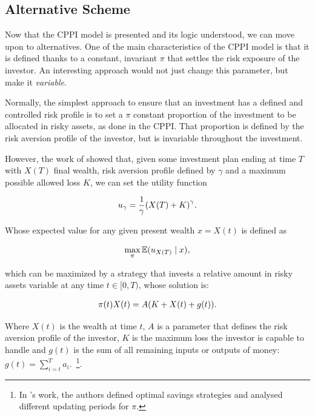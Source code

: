 \subsection{Alternative Scheme}

Now that the CPPI model is presented and its logic understood, we can move upon to alternatives. One of the main characteristics of the CPPI model is that it is defined thanks to a constant, invariant $\pi$ that settles the risk exposure of the investor. An interesting approach would not just change this parameter, but make it \emph{variable}.

Normally, the simplest approach to ensure that an investment has a defined and controlled risk profile is to set a $\pi$ constant proportion of the investment to be allocated in risky assets, as done in the CPPI. That proportion is defined by the risk aversion profile of the investor, but is invariable throughout the investment.

However, the work of \cite{a:guillen-optimisation} showed that, given some investment plan ending at time $T$ with $X(T)$ final wealth, risk aversion profile defined by $\gamma$ and a maximum possible allowed loss $K$, we can set the utility function

\begin{align}
    u_\gamma = \frac{1}{\gamma}\qty(X(T) + K)^\gamma \emph{.}
\end{align}

Whose expected value for any given present wealth $x = X(t)$ is defined as

\begin{align}\label{eq:maxE}
    \max_{\pi}\EX\giventhat{u_{X(T)}}{x} \emph{,}
\end{align}

which can be maximized by a strategy that invests a relative amount in risky assets variable at any time $t \in [0,T)$, whose solution is:

\begin{align}\label{eq:the_formula}
    \pi(t)X(t) = A\qty(K + X(t) + g(t)) \textit{.}
\end{align}

Where $X(t)$ is the wealth at time $t$, $A$ is a parameter that defines the risk aversion profile of the investor, $K$ is the maximum loss the investor is capable to handle and $g(t)$ is the sum of all remaining inputs or outputs of money: $g(t) = \sum_{i=t}^{T}a_i$.~\footnote{In \cite{a:donnelly-savings-decisions}'s work, the authors defined optimal savings strategies and analysed different updating periods for $\pi$.}.


